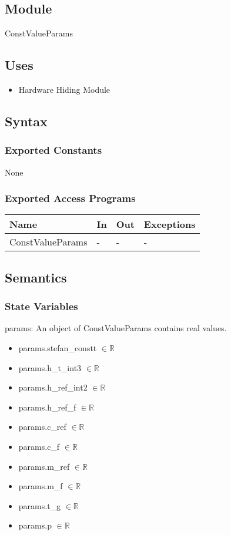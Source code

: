 \documentclass[12pt, titlepage]{article}
\begin{document}
\subsection{Module}

ConstValueParams

\subsection{Uses}
\begin{itemize}
\item Hardware Hiding Module
\end{itemize}

\subsection{Syntax}

\subsubsection{Exported Constants}
None

\subsubsection{Exported Access Programs}

\begin{center}
\begin{tabular}{p{2cm} p{4cm} p{4cm} p{2cm}}
\hline
\textbf{Name} & \textbf{In} & \textbf{Out} & \textbf{Exceptions} \\
\hline
ConstValueParams & - & - & - \\
\hline
\end{tabular}
\end{center}

\subsection{Semantics}

\subsubsection{State Variables}

params: An object of ConstValueParams contains real values. 
\begin{itemize}
 \item params.stefan\_constt $\in \mathbb{R}$
 \item params.h\_t\_int3 $\in \mathbb{R}$
 \item params.h\_ref\_int2 $\in \mathbb{R}$
 \item params.h\_ref\_f $\in \mathbb{R}$
 \item params.c\_ref $\in \mathbb{R}$
 \item params.c\_f $\in \mathbb{R}$
 \item params.m\_ref $\in \mathbb{R}$
 \item params.m\_f $\in \mathbb{R}$
 \item params.t\_g $\in \mathbb{R}$
 \item params.p $\in \mathbb{R}$
 
\end{itemize}
\end{document}

